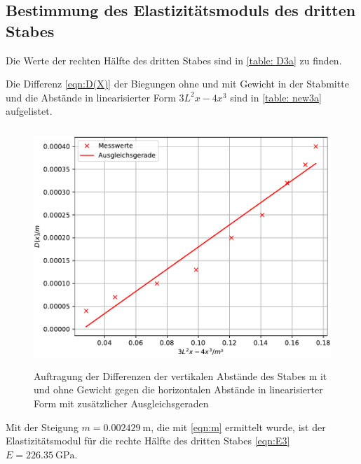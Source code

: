 \subsection{Bestimmung des Elastizitätsmoduls des dritten Stabes}
Die Werte der rechten Hälfte des dritten Stabes sind in \ref{table: D3a} zu finden.

Die Differenz \eqref{eqn:D(X)} der Biegungen ohne und mit Gewicht in der Stabmitte
und die Abstände in linearisierter Form $3L^2x-4x^3$ sind in \ref{table: new3a} aufgelistet.

\begin{figure}
  \centering
  \includegraphics[width=12cm, height=9cm]{./plots/Stange3a.pdf}
  \caption{Auftragung der Differenzen der vertikalen Abstände des Stabes m      it und ohne Gewicht gegen die horizontalen Abstände in linearisierter Form       mit zusätzlicher Ausgleichsgeraden}
  \label{fig:plot3a}
\end{figure}
Mit der Steigung $m = \SI{0.002429}{\meter}$, die mit \eqref{eqn:m}%
ermittelt wurde, ist der Elastizitätsmodul für die rechte
Hälfte des dritten Stabes \eqref{eqn:E3} $E =\SI{226.35}{\giga\pascal}$.

